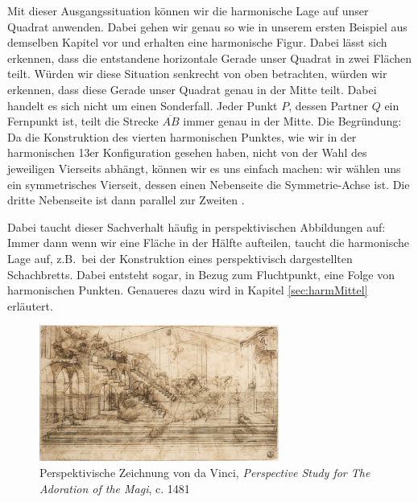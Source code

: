 \documentclass[12pt,a4paper]{article}
\begin{document}
Mit dieser Ausgangssituation können wir die harmonische Lage auf unser Quadrat anwenden. Dabei gehen wir genau so wie in unserem ersten Beispiel aus demselben Kapitel vor und erhalten eine harmonische Figur. Dabei lässt sich erkennen, dass die entstandene horizontale Gerade unser Quadrat in zwei Flächen teilt. Würden wir diese Situation senkrecht von oben betrachten, würden wir erkennen, dass diese Gerade unser Quadrat genau in der Mitte teilt. Dabei handelt es sich nicht um einen Sonderfall. Jeder Punkt $P$, dessen Partner $Q$ ein Fernpunkt ist, teilt die Strecke $\overline{A B}$ immer genau in der Mitte.
\newline
Die Begründung: Da die Konstruktion des vierten harmonischen Punktes, wie wir in der harmonischen 13er Konfiguration gesehen haben, nicht von der Wahl des jeweiligen Vierseits abhängt, können wir es uns einfach machen: wir wählen uns ein symmetrisches Vierseit, dessen einen Nebenseite die Symmetrie-Achse ist. Die dritte Nebenseite ist dann parallel zur Zweiten \citep[vgl.~][S.~50]{projektiveGeometrie}.

Dabei taucht dieser Sachverhalt häufig in perspektivischen Abbildungen auf: Immer dann wenn wir eine Fläche in der Hälfte aufteilen, taucht die harmonische Lage auf, z.B.~bei der Konstruktion eines perspektivisch dargestellten Schachbretts. Dabei entsteht sogar, in Bezug zum Fluchtpunkt, eine Folge von harmonischen Punkten. Genaueres dazu wird in Kapitel \ref{sec:harmMittel} erläutert.

\begin{figure}[htbp]
\centering
\includegraphics[width=0.7\textwidth]{Bilder/daVinvi1.jpg}
\caption{Perspektivische Zeichnung von da Vinci, \textit{Perspective Study for The Adoration of the Magi}, c. 1481\protect\footnotemark[2]}
\label{fig:daVinci}
\end{figure}

\end{document}
